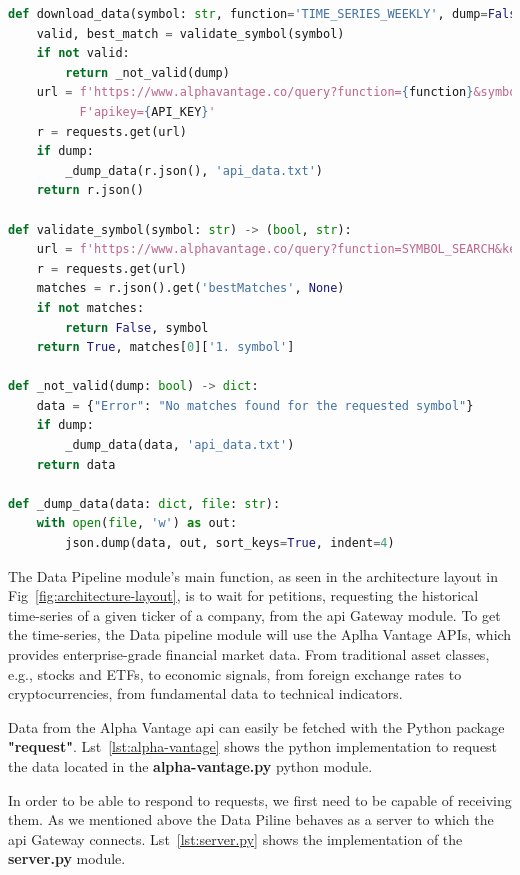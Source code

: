 \begin{lstlisting}[language=python,caption=aplha-vantage.py,label={lst:alpha-vantage}]
def download_data(symbol: str, function='TIME_SERIES_WEEKLY', dump=False) -> dict:
    valid, best_match = validate_symbol(symbol)
    if not valid:
        return _not_valid(dump)
    url = f'https://www.alphavantage.co/query?function={function}&symbol={best_match}&interval=5min&' \
          F'apikey={API_KEY}'
    r = requests.get(url)
    if dump:
        _dump_data(r.json(), 'api_data.txt')
    return r.json()

def validate_symbol(symbol: str) -> (bool, str):
    url = f'https://www.alphavantage.co/query?function=SYMBOL_SEARCH&keywords={symbol}&apikey={API_KEY}'
    r = requests.get(url)
    matches = r.json().get('bestMatches', None)
    if not matches:
        return False, symbol
    return True, matches[0]['1. symbol']

def _not_valid(dump: bool) -> dict:
    data = {"Error": "No matches found for the requested symbol"}
    if dump:
        _dump_data(data, 'api_data.txt')
    return data

def _dump_data(data: dict, file: str):
    with open(file, 'w') as out:
        json.dump(data, out, sort_keys=True, indent=4)
\end{lstlisting}

The Data Pipeline module's main function, as seen in the architecture layout in Fig~\ref{fig:architecture-layout}, is to wait for petitions, requesting the historical time-series of a given ticker of a company, from the \gls{api} Gateway module. To get the time-series, the Data pipeline module will use the Aplha Vantage APIs, which provides enterprise-grade financial market data. From traditional asset classes, e.g., stocks and ETFs, to economic signals, from foreign exchange rates to cryptocurrencies, from fundamental data to technical indicators.~\cite{alphaVantage}

Data from the Alpha Vantage \gls{api} can easily be fetched with the Python package \textbf{"request"}. Lst~\ref{lst:alpha-vantage} shows the python implementation to request the data located in the \textbf{alpha-vantage.py} python module.

In order to be able to respond to requests, we first need to be capable of receiving them. As we mentioned above the Data Piline behaves as a server to which the \gls{api} Gateway connects. Lst~\ref{lst:server.py} shows the implementation of the \textbf{server.py} module.

